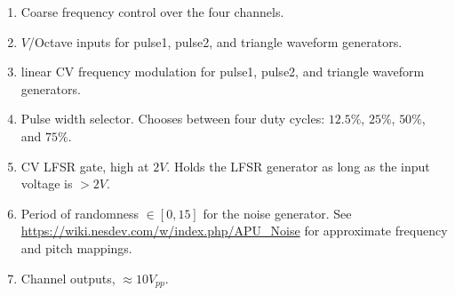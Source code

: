 \documentclass[12pt,a4paper]{article}
\begin{document}
\begin{enumerate}
  \item Coarse frequency control over the four channels.
  \item $V$/Octave inputs for pulse1, pulse2, and triangle waveform generators.
  \item linear CV frequency modulation for pulse1, pulse2, and triangle waveform generators.
  \item Pulse width selector. Chooses between four duty cycles: $12.5\%$, $25\%$, $50\%$, and $75\%$.
  \item CV LFSR gate, high at $2V$. Holds the LFSR generator as long as the input voltage is $>2V$.
  \item Period of randomness $\in [0, 15]$ for the noise generator. See \url{https://wiki.nesdev.com/w/index.php/APU_Noise} for approximate frequency and pitch mappings.
  \item Channel outputs, ${\approx}10V_{pp}$.
\end{enumerate}


\clearpage
\renewcommand\refname{References \& Acknowledgments}
\nocite{*}


\end{document}
